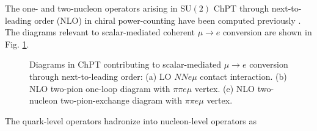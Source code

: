 \documentclass[12pt,letterpaper]{book}
\begin{document}
The one- and two-nucleon operators arising in SU$(2)$ ChPT through next-to-leading order (NLO) in chiral power-counting have been computed previously \cite{Crivellin:2014cta,2018PhRvC..98a5208B,Crivellin:2013ipa,Korber:2017ery}. The diagrams relevant to scalar-mediated coherent $\mu\rightarrow e$ conversion are shown in Fig. \ref{fig:mm_decay_diagrams}. 
\begin{figure}
\hfill
{}
\hfill
{}
\caption{Diagrams in ChPT contributing to scalar-mediated $\mu\rightarrow e$ conversion through next-to-leading order: (a) LO $NNe\mu$ contact interaction. (b) NLO two-pion one-loop diagram with $\pi\pi e\mu$ vertex. (e) NLO two-nucleon two-pion-exchange diagram with $\pi\pi e\mu$ vertex.}
\label{fig:mm_decay_diagrams}
\end{figure}
The quark-level operators hadronize into nucleon-level operators as
\end{document}
